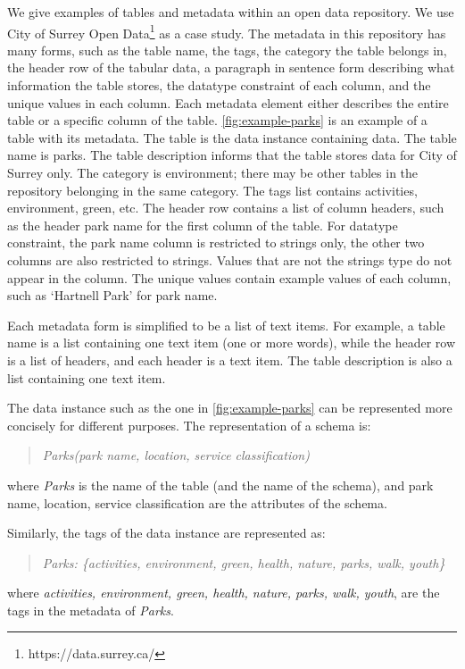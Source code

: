 We give examples of tables and metadata within an open data repository. We use City of Surrey Open Data\footnote{https://data.surrey.ca/} as a case study. The metadata in this repository has many forms, such as the table name, the tags, the category the table belongs in, the header row of the tabular data, a paragraph in sentence form describing what information the table stores, the datatype constraint of each column, and the unique values in each column. Each metadata element either describes the entire table or a specific column of the table. \autoref{fig:example-parks} is an example of a table with its metadata. The table is the data instance containing data. The table name is parks. The table description informs that the table stores data for City of Surrey only. The category is environment; there may be other tables in the repository belonging in the same category. The tags list contains activities, environment, green, etc. The header row contains a list of column headers, such as the header park name for the first column of the table. For datatype constraint, the park name column is restricted to strings only, the other two columns are also restricted to strings. Values that are not the strings type do not appear in the column. The unique values contain example values of each column, such as `Hartnell Park' for park name.

Each metadata form is simplified to be a list of text items. For example, a table name is a list containing one text item (one or more words), while the header row is a list of headers, and each header is a text item. The table description is also a list containing one text item.

The data instance such as the one in \autoref{fig:example-parks} can be represented more concisely for different purposes. The representation of a schema is:
\begin{quote}
\textit{Parks(park name, location, service classification)}
\end{quote}
where \textit{Parks} is the name of the table (and the name of the schema), and park name, location, service classification are the attributes of the schema.

Similarly, the tags of the data instance are represented as:
\begin{quote}
\textit{Parks: \{activities, environment, green, health, nature, parks, walk, youth\}}
\end{quote}
where \textit{activities, environment, green, health, nature, parks, walk, youth}, are the tags in the metadata of \textit{Parks}.

